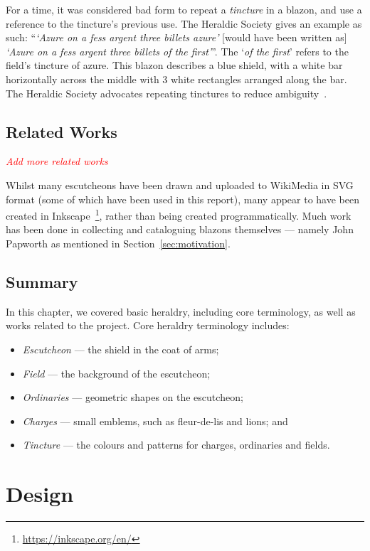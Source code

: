 \documentclass[nobib, a4paper, twoside, justified]{tufte-book}
\newcommand{\footnoteurl}[1]{\footnote{\url{#1}}}
\newcommand{\todo}[1]{{\noindent\textcolor{Red}{\textit{\quad#1}}\par}}
\begin{document}
For a time, it was considered bad form to repeat a \textit{tincture} in a blazon, and use a
reference to the tincture's previous use. The Heraldic Society gives an example as such:
``\textit{`Azure on a fess argent three billets azure'} [would have been written as] \textit{`Azure
on a fess argent three billets of the first'}''. The `\textit{of the first}' refers to the field's
tincture of azure. This blazon describes a blue shield, with a white bar horizontally across the
middle with 3 white rectangles arranged along the bar. The Heraldic Society advocates repeating
tinctures to reduce ambiguity~\autocite{blazon_in_coa}.

\section{Related Works}%
\label{sec:related_works}

\todo{Add more related works}

Whilst many escutcheons have been drawn and uploaded to WikiMedia in SVG format (some of which have
been used in this report), many appear to have been created in
Inkscape~\footnoteurl{https://inkscape.org/en/}, rather than being created programmatically.
Much work has been done in collecting and cataloguing blazons themselves --- namely John Papworth
as mentioned in Section~\ref{sec:motivation}.

\section{Summary}%
\label{sec:background_summary}

In this chapter, we covered basic heraldry, including core terminology, as well as works related to
the project. Core heraldry terminology includes:

\begin{itemize}
  \item \textit{Escutcheon} --- the shield in the coat of arms;
  \item \textit{Field} --- the background of the escutcheon;
  \item \textit{Ordinaries} --- geometric shapes on the escutcheon;
  \item \textit{Charges} --- small emblems, such as fleur-de-lis and lions; and
  \item \textit{Tincture} --- the colours and patterns for charges, ordinaries and fields.
\end{itemize}

\chapter{Design}%
\label{cha:design}
\end{document}
